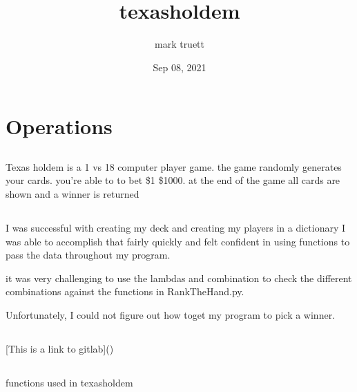 \documentclass[letterpaper,10pt,english]{sphinxmanual}
\title{texasholdem}
\date{Sep 08, 2021}
\author{mark truett}
\begin{document}
\pagestyle{empty}
\sphinxmaketitle
\pagestyle{plain}
\sphinxtableofcontents
\pagestyle{normal}
\label{\detokenize{index::doc}}



\chapter{Operations}
\label{\detokenize{readme:operations}}\label{\detokenize{readme::doc}}

\section{}
\label{\detokenize{readme:purpose}}
\sphinxAtStartPar
Texas holdem is a 1 vs 1\sphinxhyphen{}8 computer player game.
the game randomly generates your cards. you’re able to to bet
\$1 \sphinxhyphen{} \$1000. at the end of the game all cards are shown and a winner
is returned


\section{}
\label{\detokenize{readme:challenges-and-successes}}
\sphinxAtStartPar
I was successful with creating my deck and creating my players in a dictionary
I was able to accomplish that fairly quickly and felt confident in using functions to pass the data
throughout my program.

\sphinxAtStartPar
it was very challenging to use the lambdas and combination to check the different combinations
against the functions in RankTheHand.py.

\sphinxAtStartPar
Unfortunately, I could not figure out how toget my program to pick a winner.


\section{}
\label{\detokenize{readme:link}}
\sphinxAtStartPar
{[}This is a link to gitlab{]}()


\section{}
\label{\detokenize{readme:functions-used-in-operations}}
\sphinxAtStartPar
functions used in texasholdem
\end{document}
